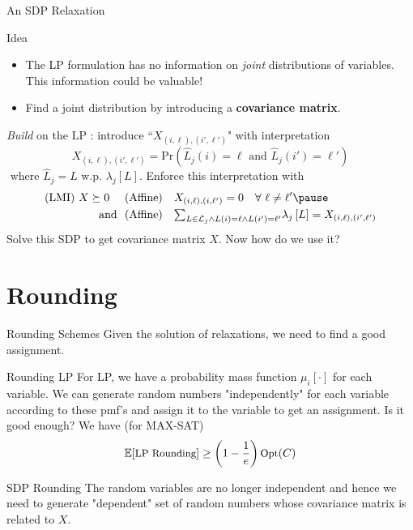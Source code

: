 \documentclass[10pt,t,compress]{beamer}
\begin{document}
\begin{frame}{An SDP Relaxation}
\begin{block}{Idea}
\begin{itemize}
\item The LP formulation has no information on \textit{joint} distributions of variables. This information could be valuable! \pause
\item Find a joint distribution by introducing a \textbf{covariance matrix}. \pause
\end{itemize}
\end{block}
\textit{Build} on the LP : introduce  ``$X_{(i,\ell),(i',\ell')}$" with interpretation \pause
$$X_{(i,\ell),(i',\ell')} = \text{Pr}\left( \hat{L}_j(i) = \ell \text{ and } \hat{L}_j(i') = \ell'\right)
 $$\pause
$ \text{ where } \hat{L}_j = L  \text{ w.p. } \lambda_j\left[L\right]$. \pause Enforce this interpretation with \pause 
\begin{align*}
 \text{(LMI) } X \succeq 0  \quad & \text{ (Affine)} \quad X_{(i,\ell),(i,\ell')} = 0  \quad  \forall ~  \ell \neq \ell' \pause \\
 \text{ and } &\text{ (Affine)} \quad \textstyle{\sum_{L \in \mathcal{L}_j \wedge L(i) = \ell \wedge L(i') = \ell'}} \lambda_j\left[L\right] = X_{(i,\ell),(i',\ell')} 
\end{align*}
\pause
Solve this SDP to get covariance matrix $X$. \pause Now how do we use it?
\end{frame}

\section{Rounding}
\begin{frame}{Rounding Schemes}
Given the solution of relaxations, we need to find a good assignment.
\pause
\begin{block}{Rounding LP}
For LP, we have a probability mass function $\mu_i[\cdot]$ for each variable. \pause We can generate random numbers "independently" for each variable according to these pmf's and assign it to the variable to get an assignment. \pause Is it good enough? \pause We have (for MAX-SAT)
\[\small \mathbb{E}[\mbox{LP Rounding}] \geq \left(1-\frac{1}{e} \right) \mbox{Opt}(C) \]
\end{block}

\pause
\begin{block}{SDP Rounding}
The random variables are no longer independent and hence we need to generate "dependent" set of random numbers whose covariance matrix is related to $X$.
\end{block}
\end{frame}
\end{document}
